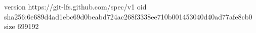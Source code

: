 version https://git-lfs.github.com/spec/v1
oid sha256:6e689d4ad1ebc69d0beabd724ac268f3338ee710b001453040d40ad77afe8cb0
size 699192
